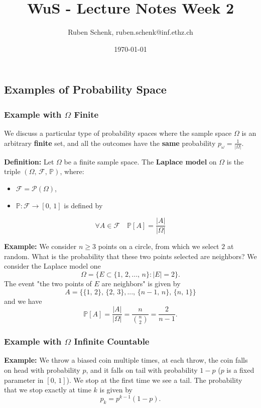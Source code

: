 \documentclass[a4paper]{extarticle}
\title{WuS - Lecture Notes Week 2}
\author{Ruben Schenk, ruben.schenk@inf.ethz.ch}
\date{\today}
\begin{document}
\maketitle
\newpage

\subsection{Examples of Probability Space}

\subsubsection{Example with \(\Omega\) Finite}

We discuss a particular type of probability spaces where the sample space \(\Omega\) is an arbitrary \textbf{finite} set, and all the outcomes have the \textbf{same} probability \(p_{\omega} = \frac{1}{|\Omega|}\).

\textbf{Definition:} Let \(\Omega\) be a finite sample space. The \textbf{Laplace model} on \(\Omega\) is the triple \((\Omega, \, \mathcal{F}, \, \mathbb{P})\), where:

\begin{itemize}
    \item \(\mathcal{F} = \mathcal{P}(\Omega)\),
    \item \(\mathbb{P} : \mathcal{F} \to [0, \, 1]\) is defined by
\end{itemize}
\[
    \forall A \in \mathcal{F} \quad \mathbb{P}[A] = \frac{|A|}{|\Omega|}
\]

\begin{ebox}
    \textbf{Example:} We consider \(n \geq 3\) points on a circle, from which we select \(2\) at random. What is the probability that these two points selected are neighbors? We consider the Laplace model one
    \[
        \Omega = \{E \subset \{1, \, 2,..., \, n\} : |E| = 2\}.
    \]
    The event "the two points of \(E\) are neighbors" is given by
    \[
        A = \{\{1, \, 2\}, \, \{2, \, 3\},..., \, \{n-1, \, n\}, \, \{n, \, 1\}\}
    \]
    and we have
    \[
        \mathbb{P}[A] = \frac{|A|}{|\Omega|} = \frac{n}{\binom{n}{2}} = \frac{2}{n - 1}.
    \]
\end{ebox}

\subsubsection{Example with \(\Omega\) Infinite Countable}

\textbf{Example:} We throw a biased coin multiple times, at each throw, the coin falls on head with probability \(p\), and it falls on tail with probability \(1 - p\) (\(p\) is a fixed parameter in \([0, \, 1]\)). We stop at the first time we see a tail. The probability that we stop exactly at time \(k\) is given by
\[
    p_k = p^{k-1}(1-p).
\]
\end{document}
